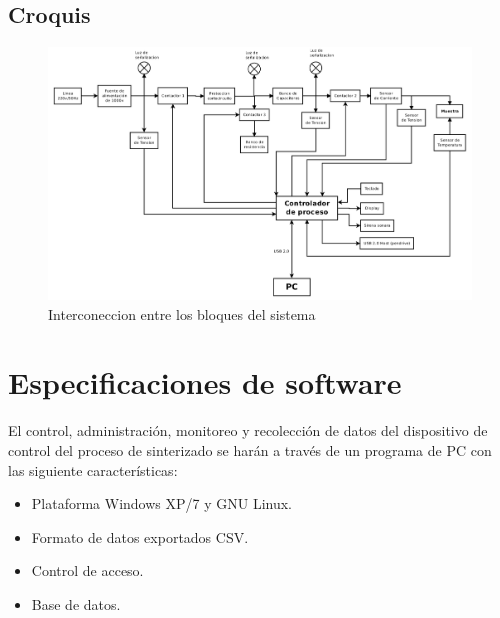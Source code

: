\documentclass[12pt]{article}
\begin{document}
\newpage

    \subsection{ Croquis }

    \begin{figure}[h!]
    \centering
    \includegraphics[width=500px]{../../Documentacion/Diagramas/diagramaBloquesEspecificaciones.png}
    \caption{Interconeccion entre los bloques del sistema}
    \end{figure}

\newpage

  \section{Especificaciones de software}

    El control, administración, monitoreo y recolección de datos del dispositivo de control del proceso de sinterizado se harán a través de 
    un programa de PC con las siguiente características:
    
    \begin{itemize}
      \item Plataforma Windows XP/7 y GNU Linux.
      \item Formato de datos exportados CSV.
      \item Control de acceso.
      \item Base de datos.
    \end{itemize}
  
\end{document}
